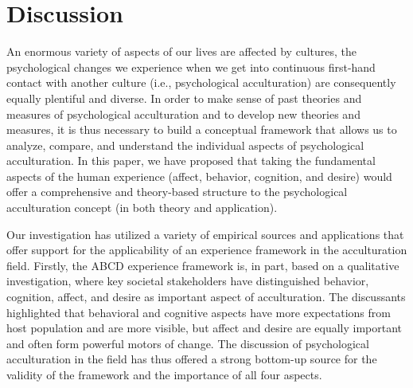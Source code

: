 \documentclass[man, 12pt, a4paper, mask]{apa7}
\begin{document}
\section{Discussion}
An enormous variety of aspects of our lives are affected by cultures, the psychological changes we experience when we get into continuous first-hand contact with another culture (i.e., psychological acculturation) are consequently equally plentiful and diverse.
In order to make sense of past theories and measures of psychological acculturation and to develop new theories and measures, it is thus necessary to build a conceptual framework that allows us to analyze, compare, and understand the individual aspects of psychological acculturation.
In this paper, we have proposed that taking the fundamental aspects of the human experience (affect, behavior, cognition, and desire) would offer a comprehensive and theory-based structure to the psychological acculturation concept (in both theory and application). 

Our investigation has utilized a variety of empirical sources and applications that offer support for the applicability of an experience framework in the acculturation field. Firstly, the ABCD experience framework is, in part, based on a qualitative investigation, where key societal stakeholders have distinguished behavior, cognition, affect, and desire as important aspect of acculturation. The discussants highlighted that behavioral and cognitive aspects have more expectations from host population and are more visible, but affect and desire are equally important and often form powerful motors of change. The discussion of psychological acculturation in the field has thus offered a strong bottom-up source for the validity of the framework and the importance of all four aspects.
\end{document}
